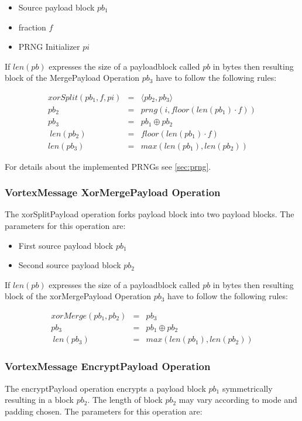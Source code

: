 \begin{itemize}
	\item Source payload block $pb_1$
	\item fraction $f$
	\item PRNG Initializer $pi$
\end{itemize}

If $len(pb)$ expresses the size of a payloadblock called $pb$ in bytes then resulting block of the MergePayload Operation $pb_3$ have to follow the following rules:

\begin{eqnarray}
xorSplit(pb_1, f, pi) & = & \langle pb_2,pb_3 \rangle \\
pb_2 & = & prng( i, floor(len(pb_1)\cdot f) )\\
pb_3 & = & pb_1 \oplus pb_2\\\
len(pb_2) & = & floor(len(pb_1)\cdot f)\\
len(pb_3) & = & max( len(pb_1), len(pb_2) )
\end{eqnarray}

For details about the implemented PRNGs see \ref{sec:prng}.

\subsubsection{VortexMessage XorMergePayload Operation}
The xorSplitPayload operation forks payload block into two payload blocks. The parameters for this operation are:

\begin{itemize}
	\item First source payload block $pb_1$
	\item Second source payload block $pb_2$
\end{itemize}

If $len(pb)$ expresses the size of a payloadblock called $pb$ in bytes then resulting block of the xorMergePayload Operation $pb_3$ have to follow the following rules:

\begin{eqnarray}
xorMerge(pb_1, pb_2) & = & pb_3 \\
pb_3 & = & pb_1 \oplus pb_2\\\
len(pb_3) & = & max( len(pb_1), len(pb_2) )
\end{eqnarray}


\subsubsection{VortexMessage EncryptPayload Operation}
The encryptPayload operation encrypts a payload block $pb_1$ symmetrically resulting in a block $pb_2$. The length of block $pb_2$ may vary according to mode and padding chosen. The parameters for this operation are:

